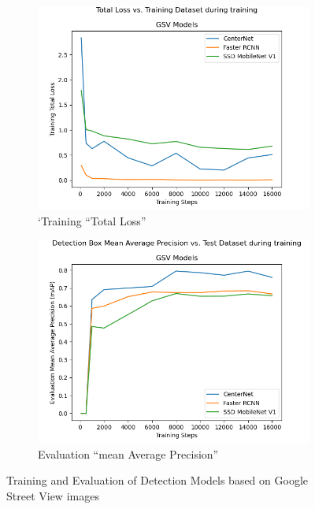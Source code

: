 \documentclass[11pt,twoside]{report}
\begin{document}
\begin{figure}[h]
\centering
\begin{subfigure}{0.45\textwidth}
	\includegraphics[width=\textwidth]{fig_gsv_loss.png}
	\caption{`Training ``Total Loss''}
	\label{fig:rq1a}
\end{subfigure}
\hfill
\begin{subfigure}{0.45\textwidth}
	\includegraphics[width=\textwidth]{fig_gsv_map.png}
	\caption{Evaluation ``mean Average Precision''}
	\label{fig:rq1b}
\end{subfigure}
\caption{Training and Evaluation of Detection Models based on Google Street View images}
\label{fig:rq2}
\end{figure}
\end{document}

